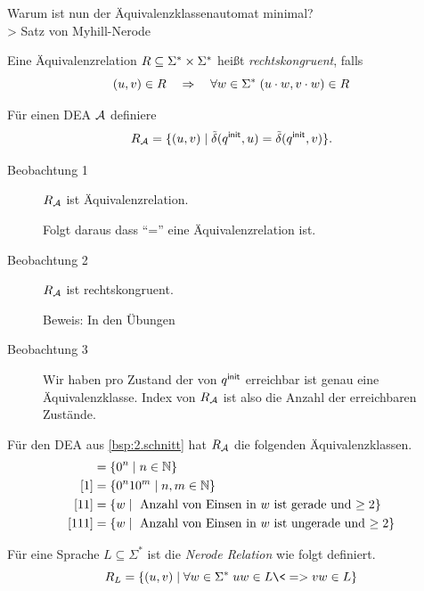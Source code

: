 Warum ist nun der Äquivalenzklassenautomat minimal?\\
\-> Satz von Myhill-Nerode
\begin{Def}[name={[Rechtskongruente Äquivalenzrelation]}]
        Eine Äquivalenzrelation $R\subseteq\Sigma^*\times\Sigma^*$ heißt \emph{rechtskongruent}, falls
        \[ (u,v)\in R \quad\=>\quad \forall w\in\Sigma^*\;(u\cdot w,v\cdot w) \in R \]
\end{Def}
\begin{Bsp} %
  \label{Bsp:R_m}
        Für einen \ac{DEA} $\mathcal{A}$ definiere
        \[ R_{\mathcal{A}} = \{(u,v) \mid \tilde\delta({q^\mathsf{init}},u)=\tilde\delta({q^\mathsf{init}},v)\}. \]
        \begin{description}
                \item[Beobachtung 1] $R_{\mathcal{A}}$ ist Äquivalenzrelation.
                
                Folgt daraus dass ``='' eine Äquivalenzrelation ist.
                \item[Beobachtung 2] $R_{\mathcal{A}}$ ist rechtskongruent. 
                
                Beweis: In den Übungen
                \item[Beobachtung 3] Wir haben pro Zustand der von ${q^\mathsf{init}}$ erreichbar ist genau eine Äquivalenzklasse.
                Index von $R_{\mathcal{A}}$ ist also die Anzahl der erreichbaren Zustände.
        \end{description}
        
        \medskip
        
        Für den \ac{DEA} aus \autoref{bsp:2.schnitt} hat $R_{\mathcal{A}}$ die folgenden Äquivalenzklassen.
        \begin{align*}
        [\Eps] &= \{0^n\mid n\in \N\}\\
        [1] &= \{0^n10^m\mid n,m\in \N\}\\
        [11] &= \{w\mid \text{ Anzahl von Einsen in $w$ ist gerade und $\geq 2$}\}\\
        [111] &= \{w\mid \text{ Anzahl von Einsen in $w$ ist ungerade und $\geq 2$}\}\\
        \end{align*}
\end{Bsp}
\begin{Def}
        Für eine Sprache $L\subseteq \Sigma^*$ ist die \emph{Nerode Relation} wie folgt definiert.
        \[ R_L = \{(u,v) \mid \forall w\in\Sigma^*\; uw\in L \<=> vw\in L \} \]
\end{Def}
